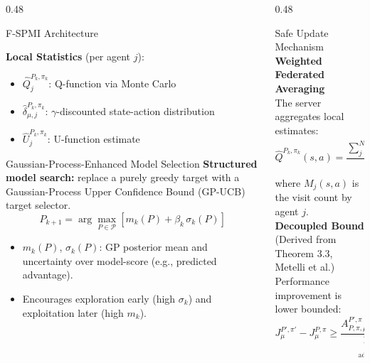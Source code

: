 \documentclass[final,t]{beamer}
\begin{document}
\begin{frame}[t]
\begin{columns}[T]
\begin{column}{0.48\textwidth}
\begin{block}{F-SPMI Architecture}
\begin{center}
\begin{tikzpicture}
\end{tikzpicture}
\end{center}
\vspace{0.3cm}
\textbf{Local Statistics} (per agent $j$):
\begin{itemize}
    \item $\hat{Q}_j^{P_k, \pi_k}$: Q-function via Monte Carlo
    \item $\hat{\delta}_{\mu,j}^{P_k, \pi_k}$: $\gamma$-discounted state-action distribution
    \item $\hat{U}_j^{P_k, \pi_k}$: U-function estimate
\end{itemize}
\end{block}

\begin{block}{Gaussian-Process-Enhanced Model Selection}
\textbf{Structured model search:} replace a purely greedy target with a Gaussian-Process Upper Confidence Bound (GP-UCB) target selector.
\begin{equation*}
P_{k+1}=\arg\max_{P\in\mathcal{P}}\left[m_k(P)+\beta_k\,\sigma_k(P)\right]
\end{equation*}
\begin{itemize}
  \item $m_k(P)$, $\sigma_k(P)$: GP posterior mean and uncertainty over model-score (e.g., predicted advantage).
  \item Encourages exploration early (high $\sigma_k$) and exploitation later (high $m_k$).
\end{itemize}
\end{block}
\end{column}

\begin{column}{0.48\textwidth}
\begin{block}{Safe Update Mechanism}
\vspace{0.3cm}
\textbf{Weighted Federated Averaging}\\[0.2cm]
The server aggregates local estimates:
\begin{equation*}
\hat{Q}^{P_k, \pi_k}(s,a) = \frac{\sum_{j=1}^N M_j(s,a) \hat{Q}_j^{P_k, \pi_k}(s,a)}{\sum_{j=1}^N M_j(s,a)}
\end{equation*}
where $M_j(s,a)$ is the visit count by agent $j$.\\[0.4cm]

\textbf{Decoupled Bound} (Derived from Theorem 3.3, Metelli et al.)\\[0.2cm]
Performance improvement is lower bounded:
\begin{equation*}
J_\mu^{P', \pi'} - J_\mu^{P, \pi} \geq \underbrace{\frac{A_{P,\pi,\mu}^{P',\pi} + A_{P,\pi,\mu}^{P,\pi'}}{1-\gamma}}_{\text{advantage}} - \underbrace{\frac{\gamma \Delta \hat{Q}^{P, \pi}(s,a) D}{2(1-\gamma)^2}}_{\text{penalization}} = \hat{B}(P', \pi')
\end{equation*}


\end{block}
\end{column}
\end{columns}
\end{frame}
\end{document}
